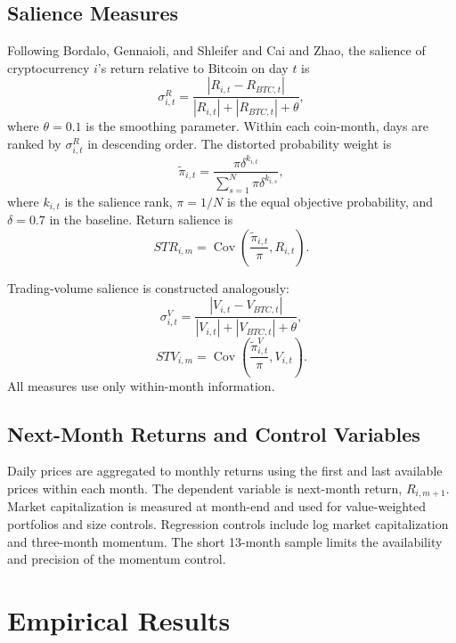\documentclass[11pt]{article}
\begin{document}
\subsection{Salience Measures}

Following Bordalo, Gennaioli, and Shleifer and Cai and Zhao, the salience of cryptocurrency $i$'s return relative to Bitcoin on day $t$ is
\begin{equation}
\sigma^{R}_{i,t} =
\frac{|R_{i,t} - R_{BTC,t}|}
{|R_{i,t}| + |R_{BTC,t}| + \theta},
\end{equation}
where $\theta = 0.1$ is the smoothing parameter. Within each coin-month, days are ranked by $\sigma^{R}_{i,t}$ in descending order. The distorted probability weight is
\begin{equation}
\tilde{\pi}_{i,t} =
\frac{\pi \delta^{k_{i,t}}}{\sum_{s=1}^{N} \pi \delta^{k_{i,s}}},
\end{equation}
where $k_{i,t}$ is the salience rank, $\pi = 1/N$ is the equal objective probability, and $\delta = 0.7$ in the baseline. Return salience is
\begin{equation}
STR_{i,m} = \operatorname{Cov}\left(\frac{\tilde{\pi}_{i,t}}{\pi}, R_{i,t}\right).
\end{equation}

Trading-volume salience is constructed analogously:
\begin{equation}
\sigma^{V}_{i,t} =
\frac{|V_{i,t} - V_{BTC,t}|}
{|V_{i,t}| + |V_{BTC,t}| + \theta},
\end{equation}
\begin{equation}
STV_{i,m} = \operatorname{Cov}\left(\frac{\tilde{\pi}^{V}_{i,t}}{\pi}, V_{i,t}\right).
\end{equation}
All measures use only within-month information.

\subsection{Next-Month Returns and Control Variables}

Daily prices are aggregated to monthly returns using the first and last available prices within each month. The dependent variable is next-month return, $R_{i,m+1}$. Market capitalization is measured at month-end and used for value-weighted portfolios and size controls. Regression controls include log market capitalization and three-month momentum. The short 13-month sample limits the availability and precision of the momentum control.

\section{Empirical Results}
\end{document}
